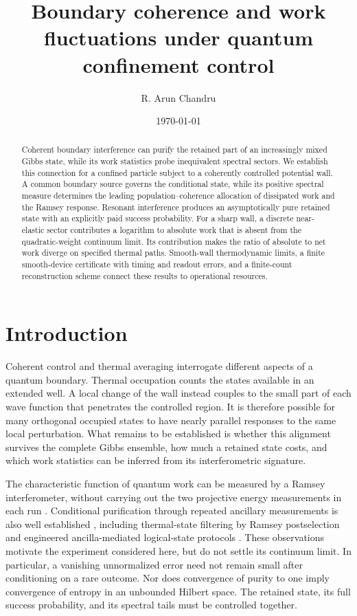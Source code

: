 \documentclass[aps,pra,reprint,superscriptaddress,longbibliography]{revtex4-2}
\begin{document}
\title{Boundary coherence and work fluctuations under quantum confinement control}
\author{R. Arun Chandru}
\date{\today}
\begin{abstract}
Coherent boundary interference can purify the retained part of an
increasingly mixed Gibbs state, while its work statistics probe
inequivalent spectral sectors. We establish this connection for a confined
particle subject to a coherently controlled potential wall. A common
boundary source governs the conditional state, while its positive
spectral measure determines the leading population--coherence
allocation of dissipated work and the Ramsey response. Resonant
interference produces an asymptotically
pure retained state with an explicitly paid success probability.
For a sharp wall, a discrete near-elastic sector contributes a
logarithm to absolute work that is absent from the quadratic-weight
continuum limit. Its contribution makes the ratio of absolute to net
work diverge on specified thermal paths. Smooth-wall thermodynamic
limits, a finite smooth-device certificate with timing and readout
errors, and a finite-count reconstruction scheme connect these results
to operational resources.
\end{abstract}
\maketitle

\section{Introduction}

Coherent control and thermal averaging interrogate different aspects of
a quantum boundary. Thermal occupation counts the states available in
an extended well. A local change of the wall instead couples to the
small part of each wave function that penetrates the controlled region.
It is therefore possible for many orthogonal occupied states to have
nearly parallel responses to the same local perturbation. What remains
to be established is whether this alignment survives the complete
Gibbs ensemble, how much a retained state costs, and which work
statistics can be inferred from its interferometric signature.

The characteristic function of quantum work can be measured by a
Ramsey interferometer, without carrying out the two projective energy
measurements in each run \cite{Dorner2013,Mazzola2013,Batalhao2014}.
Conditional purification through repeated ancillary measurements is
also well established \cite{Nakazato2003}, including thermal-state
filtering by Ramsey postselection \cite{Oyarce2019} and engineered
ancilla-mediated logical-state protocols \cite{Pushpan2025}.
These observations motivate
the experiment considered here, but do not settle its continuum limit.
In particular, a vanishing unnormalized error need not remain small
after conditioning on a rare outcome. Nor does convergence of purity
to one imply convergence of entropy in an unbounded Hilbert space.
The retained state, its full success probability, and its spectral
tails must be controlled together.
\end{document}
